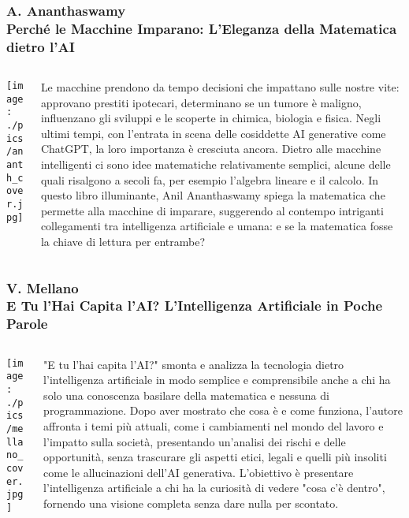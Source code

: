 \documentclass[aspectratio=169]{beamer}
\begin{document}
%
%
\begin{frame}
\frametitle{\small A. Ananthaswamy \\ \normalsize \textbf{Perché le Macchine Imparano: L'Eleganza della Matematica dietro l'AI}}
\begin{columns}[c]
\begin{column}{0.35\textwidth}
    \centering
    \texttt{[image: ./pics/ananth\_cover.jpg]}
\end{column}
\begin{column}{0.6\textwidth}
    {\small
    Le macchine prendono da tempo decisioni che impattano sulle nostre vite: approvano prestiti ipotecari, determinano se un tumore è maligno, influenzano gli sviluppi e le scoperte in chimica, biologia e fisica. Negli ultimi tempi, con l'entrata in scena delle cosiddette AI generative come ChatGPT, la loro importanza è cresciuta ancora. Dietro alle macchine intelligenti ci sono idee matematiche relativamente semplici, alcune delle quali risalgono a secoli fa, per esempio l'algebra lineare e il calcolo. In questo libro illuminante, Anil Ananthaswamy spiega la matematica che permette alla macchine di imparare, suggerendo al contempo intriganti collegamenti tra intelligenza artificiale e umana: e se la matematica fosse la chiave di lettura per entrambe?}
\end{column}
\end{columns}
\end{frame}
%
%
\begin{frame}
\frametitle{\small V. Mellano \\ \normalsize \textbf{E Tu l'Hai Capita l'AI? L'Intelligenza Artificiale in Poche Parole}}
\begin{columns}[c]
\begin{column}{0.35\textwidth}
    \centering
    \texttt{[image: ./pics/mellano\_cover.jpg]}
\end{column}
\begin{column}{0.6\textwidth}
    {\small
    "E tu l’hai capita l’AI?" smonta e analizza la tecnologia dietro l’intelligenza artificiale in modo semplice e comprensibile anche a chi ha solo una conoscenza basilare della matematica e nessuna di programmazione. Dopo aver mostrato che cosa è e come funziona, l’autore affronta i temi più attuali, come i cambiamenti nel mondo del lavoro e l’impatto sulla società, presentando un'analisi dei rischi e delle opportunità, senza trascurare gli aspetti etici, legali e quelli più insoliti come le allucinazioni dell’AI generativa. L’obiettivo è presentare l'intelligenza artificiale a chi ha la curiosità di vedere "cosa c'è dentro", fornendo una visione completa senza dare nulla per scontato.}
\end{column}
\end{columns}
\end{frame}
\end{document}
